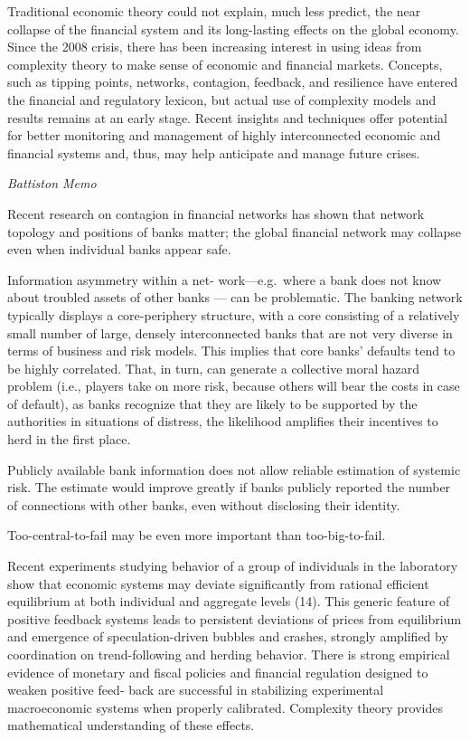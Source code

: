 \documentclass[
]{book}
\begin{document}
Traditional economic theory could not explain, much less predict, the near collapse of the financial system and its long-lasting effects on the global economy. Since the 2008 crisis, there has been increasing interest in using ideas from complexity theory to make sense of economic and financial markets. Concepts, such as tipping points, networks, contagion, feedback, and resilience have entered the financial and regulatory lexicon, but actual use of complexity models and results remains at an early stage. Recent insights and techniques offer potential for better monitoring and management of highly interconnected economic and financial systems and, thus, may help anticipate and manage future crises.

\emph{Battiston Memo}

Recent research on contagion in
financial networks has shown that network
topology and positions of banks matter; the
global financial network may collapse even
when individual banks appear safe.

Information asymmetry within a net-
work---e.g.~where a bank does not know
about troubled assets of other banks --- can
be problematic. The banking network typically displays a core-periphery structure,
with a core consisting of a relatively small
number of large, densely interconnected
banks that are not very diverse in terms of
business and risk models. This implies that
core banks' defaults tend to be highly correlated.
That, in turn, can generate a collective moral hazard problem (i.e., players
take on more risk, because others will bear
the costs in case of default), as banks recognize
that they are likely to be supported by
the authorities in situations of distress, the
likelihood amplifies their incentives to herd
in the first place.

Publicly available bank information does not allow reliable estimation of systemic risk. The
estimate would improve greatly if banks
publicly reported the number of connections with other banks, even without
disclosing their identity.

Too-central-to-fail may be even more important than
too-big-to-fail.

Recent experiments studying behavior
of a group of individuals in the laboratory
show that economic systems may deviate
significantly from rational efficient equilibrium at both individual and aggregate
levels (14). This generic feature of positive
feedback systems leads to persistent deviations
of prices from equilibrium and emergence of speculation-driven bubbles and
crashes, strongly amplified by coordination
on trend-following and herding behavior.
There is strong empirical evidence of
monetary and fiscal policies and financial
regulation designed to weaken positive feed-
back are successful in stabilizing experimental
macroeconomic systems when properly
calibrated. Complexity theory provides
mathematical understanding of these effects.
\end{document}
